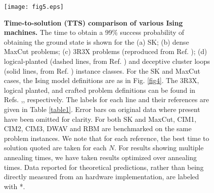 \documentclass[fleqn,10pt]{wlscirep}
\def\change#1{#1}
\begin{document}



\begin{figure}[t]
\begin{center}
\texttt{[image: fig5.eps]} 
\end{center}
\caption{ {\bf Time-to-solution (TTS) comparison of various Ising machines. }  The time to obtain a 99\% success probability of obtaining the ground state is shown for the (a) SK; (b) dense MaxCut problems; \change{(c) 3R3X problems (reproduced from Ref. \cite{kowalsky20213}); (d)  logical-planted (dashed lines, from Ref. \cite{albash2018demonstration}) and deceptive cluster loops (solid lines, from Ref. \cite{mandra2018deceptive}) instance classes.  For the SK and MaxCut cases, the  Ising model definitions are as in Fig. \ref{fig4}.  The 3R3X, logical planted, and crafted problem definitions can be found in Refs. \cite{kowalsky20213},\cite{albash2018demonstration},\cite{ mandra2018deceptive} respectively. }  The labels for each line and their references are given in Table \ref{table1}. \change{Error bars on original data where present have been omitted for clarity.} For both SK and MaxCut, CIM1, CIM2, CIM3, DWAV and RBM are benchmarked on the same problem instances.  We note that for each reference, the best time to solution quoted are taken for each $ N $.  For results showing multiple annealing times, we have taken results optimized over annealing times. \change{Data reported for theoretical predictions, rather than being directly measured from an hardware implementation, are labeled with *.}  
\label{fig5}} 
\end{figure}
\end{document}
